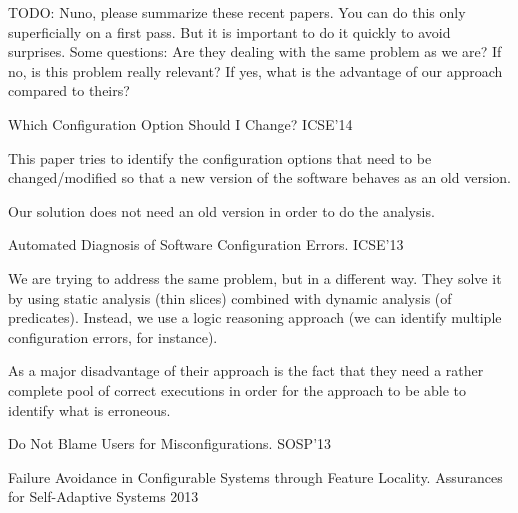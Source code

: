 TODO: Nuno, please summarize these recent papers.  You can do this
only superficially on a first pass.  But it is important to do it
quickly to avoid surprises.  Some questions: Are they dealing with the
same problem as we are?  If no, is this problem really relevant?  If
yes, what is the advantage of our approach compared to theirs?

Which Configuration Option Should I Change?  ICSE'14

This paper tries to identify the configuration options that need to be changed/modified
so that a new version of the software behaves as an old version. 

Our solution does not need an old version in order to do the analysis. 

Automated Diagnosis of Software Configuration Errors.  ICSE'13

We are trying to address the same problem, but in a different way. They solve it by using
static analysis (thin slices) combined with dynamic analysis (of predicates). Instead, we
use a logic reasoning approach (we can identify multiple configuration errors, for instance).

As a major disadvantage of their approach is the fact that they need a rather complete pool
of correct executions in order for the approach to be able to identify what is erroneous.


Do Not Blame Users for Misconfigurations.  SOSP'13

Failure Avoidance in Configurable Systems through Feature Locality. Assurances for Self-Adaptive Systems 2013
